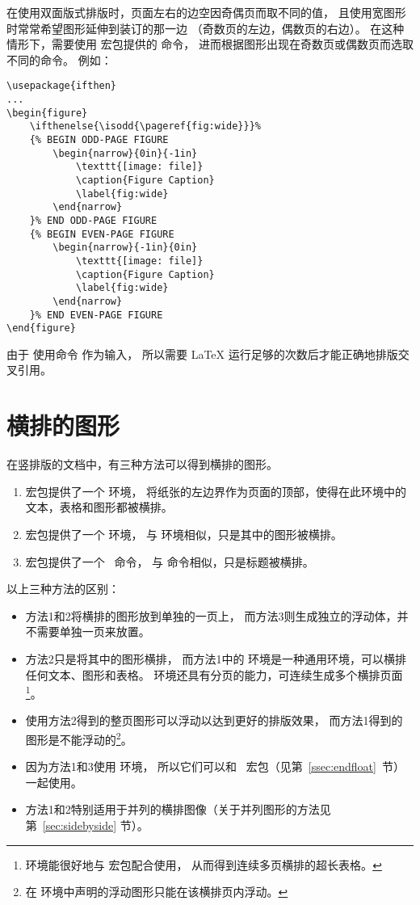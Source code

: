 在使用双面版式排版时，页面左右的边空因奇偶页而取不同的值，
且使用宽图形时常常希望图形延伸到装订的那一边
（奇数页的左边，偶数页的右边）。
在这种情形下，需要使用  宏包提供的  命令，
进而根据图形出现在奇数页或偶数页而选取不同的命令。
例如：
\begin{lstlisting}
\usepackage{ifthen}
...
\begin{figure}
	\ifthenelse{\isodd{\pageref{fig:wide}}}%
	{% BEGIN ODD-PAGE FIGURE
		\begin{narrow}{0in}{-1in}
			\texttt{[image: file]}
			\caption{Figure Caption}
			\label{fig:wide}
		\end{narrow}
	}% END ODD-PAGE FIGURE
	{% BEGIN EVEN-PAGE FIGURE
		\begin{narrow}{-1in}{0in}
			\texttt{[image: file]}
			\caption{Figure Caption}
			\label{fig:wide}
		\end{narrow}
	}% END EVEN-PAGE FIGURE
\end{figure}
\end{lstlisting}
由于  使用命令  作为输入，
所以需要 \LaTeX{} 运行足够的次数后才能正确地排版交叉引用。


\section{横排的图形}\label{sec:lscapefig}

在竖排版的文档中，有三种方法可以得到横排的图形。
\begin{enumerate}
	\item {} 宏包提供了一个  环境，
	将纸张的左边界作为页面的顶部，使得在此环境中的文本，表格和图形都被横排。
	\item {} 宏包提供了一个  环境，
	与  环境相似，只是其中的图形被横排。
	\item {} 宏包提供了一个 ~命令，
	与  命令相似，只是标题被横排。
\end{enumerate}

以上三种方法的区别：
\begin{itemize}
	\item 方法1和2将横排的图形放到单独的一页上，
	而方法3则生成独立的浮动体，并不需要单独一页来放置。
	\item 方法2只是将其中的图形横排，
	而方法1中的  环境是一种通用环境，可以横排任何文本、图形和表格。
	 环境还具有分页的能力，可连续生成多个横排页面\footnote
		{ 环境能很好地与  宏包配合使用，
		从而得到连续多页横排的超长表格。}。
	\item 使用方法2得到的整页图形可以浮动以达到更好的排版效果，
	而方法1得到的图形是不能浮动的\footnote{
		在 环境中声明的浮动图形只能在该横排页内浮动。}。
	\item 因为方法1和3使用  环境，
	所以它们可以和 ~宏包（见第~\ref{ssec:endfloat}~节）一起使用。
	\item 方法1和2特别适用于并列的横排图像（关于并列图形的方法见第~\ref{sec:sidebyside} 节）。
\end{itemize}

